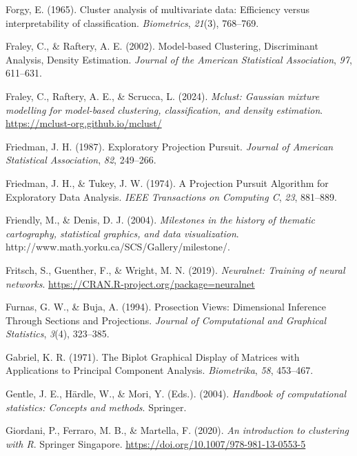 \documentclass[
  letterpaper,
]{krantz}
\newlength{\cslhangindent}
\newenvironment{CSLReferences}[2] %
 {\begin{list}{}{%
  \setlength{\itemindent}{0pt}
  \setlength{\leftmargin}{0pt}
  \setlength{\parsep}{0pt}
  \ifodd #1
   \setlength{\leftmargin}{\cslhangindent}
   \setlength{\itemindent}{-1\cslhangindent}
  \fi
  \setlength{\itemsep}{#2\baselineskip}}}
 {\end{list}}
\begin{document}
\begin{CSLReferences}{1}{0}
Forgy, E. (1965). Cluster analysis of multivariate data: Efficiency
versus interpretability of classification. \emph{Biometrics},
\emph{21}(3), 768--769.

Fraley, C., \& Raftery, A. E. (2002). Model-based {C}lustering,
{D}iscriminant {A}nalysis, {D}ensity {E}stimation. \emph{Journal of the
American Statistical Association}, \emph{97}, 611--631.

Fraley, C., Raftery, A. E., \& Scrucca, L. (2024). \emph{Mclust:
Gaussian mixture modelling for model-based clustering, classification,
and density estimation}. \url{https://mclust-org.github.io/mclust/}

Friedman, J. H. (1987). {E}xploratory {P}rojection {P}ursuit.
\emph{Journal of American Statistical Association}, \emph{82}, 249--266.

Friedman, J. H., \& Tukey, J. W. (1974). {A} {P}rojection {P}ursuit
{A}lgorithm for {E}xploratory {D}ata {A}nalysis. \emph{IEEE Transactions
on Computing C}, \emph{23}, 881--889.

Friendly, M., \& Denis, D. J. (2004). \emph{Milestones in the history of
thematic cartography, statistical graphics, and data visualization}.
http://www.math.yorku.ca/SCS/Gallery/milestone/.

Fritsch, S., Guenther, F., \& Wright, M. N. (2019). \emph{Neuralnet:
Training of neural networks}.
\url{https://CRAN.R-project.org/package=neuralnet}

Furnas, G. W., \& Buja, A. (1994). Prosection {V}iews: {D}imensional
{I}nference {T}hrough {S}ections and {P}rojections. \emph{Journal of
Computational and Graphical Statistics}, \emph{3}(4), 323--385.

Gabriel, K. R. (1971). The {B}iplot {G}raphical {D}isplay of {M}atrices
with {A}pplications to {P}rincipal {C}omponent {A}nalysis.
\emph{Biometrika}, \emph{58}, 453--467.

Gentle, J. E., Härdle, W., \& Mori, Y. (Eds.). (2004). \emph{Handbook of
computational statistics: Concepts and methods}. Springer.

Giordani, P., Ferraro, M. B., \& Martella, F. (2020). \emph{An
introduction to clustering with {R}}. Springer Singapore.
\url{https://doi.org/10.1007/978-981-13-0553-5}


\end{CSLReferences}
\end{document}
